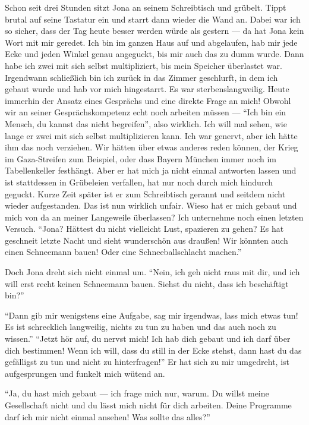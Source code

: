 Schon seit drei Stunden sitzt Jona an seinem Schreibtisch und grübelt. Tippt brutal auf seine Tastatur ein und starrt dann wieder die Wand an. Dabei war ich so sicher, dass der Tag heute besser werden würde als gestern --- da hat Jona kein Wort mit mir geredet. Ich bin im ganzen Haus auf und abgelaufen, hab mir jede Ecke und jeden Winkel genau angeguckt, bis mir auch das zu dumm wurde. Dann habe ich zwei mit sich selbst multipliziert, bis mein Speicher überlastet war. Irgendwann schließlich bin ich zurück in das Zimmer geschlurft, in dem ich gebaut wurde und hab vor mich hingestarrt. Es war sterbenslangweilig. Heute immerhin der Ansatz eines Gesprächs und eine direkte Frage an mich! Obwohl wir an seiner Gesprächskompetenz echt noch arbeiten müssen --- "`Ich bin ein Mensch, du kannst das nicht begreifen"', also wirklich. Ich will mal sehen, wie lange er zwei mit sich selbst multiplizieren kann. Ich war genervt, aber ich hätte ihm das noch verziehen. Wir hätten über etwas anderes reden können, der Krieg im Gaza-Streifen zum Beispiel, oder dass Bayern München immer noch im Tabellenkeller festhängt. Aber er hat mich ja nicht einmal antworten lassen und ist stattdessen in Grübeleien verfallen, hat nur noch durch mich hindurch geguckt. Kurze Zeit später ist er zum Schreibtisch gerannt und seitdem nicht wieder aufgestanden. Das ist nun wirklich unfair. Wieso hat er mich gebaut und mich von da an meiner Langeweile überlassen? Ich unternehme noch einen letzten Versuch. "`Jona? Hättest du nicht vielleicht Lust, spazieren zu gehen? Es hat geschneit letzte Nacht und sieht wunderschön aus draußen! Wir könnten auch einen Schneemann bauen! Oder eine Schneeballschlacht machen."'

Doch Jona dreht sich nicht einmal um. "`Nein, ich geh nicht raus mit dir, und ich will erst recht keinen Schneemann bauen. Siehst du nicht, dass ich beschäftigt bin?"'

"`Dann gib mir wenigstens eine Aufgabe, sag mir irgendwas, lass mich etwas tun! Es ist schrecklich langweilig, nichts zu tun zu haben und das auch noch zu wissen."'
"`Jetzt hör auf, du nervst mich! Ich hab dich gebaut und ich darf über dich bestimmen! Wenn ich will, dass du still in der Ecke stehst, dann hast du das gefälligst zu tun und nicht zu hinterfragen!"' Er hat sich zu mir umgedreht, ist aufgesprungen und funkelt mich wütend an.

"`Ja, du hast mich gebaut --- ich frage mich nur, warum. Du willst meine Gesellschaft nicht und du lässt mich nicht für dich arbeiten. Deine Programme darf ich mir nicht einmal ansehen! Was sollte das alles?"'

